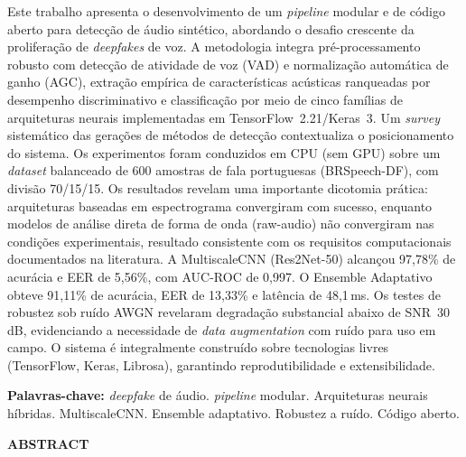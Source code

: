 \documentclass[12pt,a4paper]{article}
\begin{document}
\noindent
Este trabalho apresenta o desenvolvimento de um \textit{pipeline} modular e de
c\'{o}digo aberto para detec\c{c}\~{a}o de \'{a}udio sint\'{e}tico, abordando
o desafio crescente da prolifera\c{c}\~{a}o de \textit{deepfakes} de voz.
A metodologia integra pr\'{e}-processamento robusto com detec\c{c}\~{a}o de
atividade de voz (VAD) e normaliza\c{c}\~{a}o autom\'{a}tica de ganho (AGC),
extra\c{c}\~{a}o emp\'{i}rica de caracter\'{i}sticas ac\'{u}sticas ranqueadas
por desempenho discriminativo e classifica\c{c}\~{a}o por meio de cinco
fam\'{i}lias de arquiteturas neurais implementadas em TensorFlow~2.21/Keras~3.
Um \textit{survey} sistem\'{a}tico das gera\c{c}\~{o}es de m\'{e}todos de
detec\c{c}\~{a}o contextualiza o posicionamento do sistema.
Os experimentos foram conduzidos em CPU (sem GPU) sobre um \textit{dataset}
balanceado de 600 amostras de fala portuguesas (BRSpeech-DF), com divis\~{a}o
70/15/15.
Os resultados revelam uma importante dicotomia pr\'{a}tica: arquiteturas
baseadas em espectrograma convergiram com sucesso, enquanto modelos de
an\'{a}lise direta de forma de onda (raw-audio) n\~{a}o convergiram nas
condi\c{c}\~{o}es experimentais, resultado consistente com os requisitos
computacionais documentados na literatura.
A MultiscaleCNN (Res2Net-50) alcan\c{c}ou 97,78\% de acur\'{a}cia e EER de
5,56\%, com AUC-ROC de 0,997.
O Ensemble Adaptativo obteve 91,11\% de acur\'{a}cia, EER de 13,33\% e
lat\^{e}ncia de 48,1\,ms.
Os testes de robustez sob ru\'{i}do AWGN revelaram degrada\c{c}\~{a}o
substancial abaixo de SNR~30\,dB, evidenciando a necessidade de
\textit{data augmentation} com ru\'{i}do para uso em campo.
O sistema \'{e} integralmente constru\'{i}do sobre tecnologias livres
(TensorFlow, Keras, Librosa), garantindo reprodutibilidade e extensibilidade.

\vspace{0.4cm}
\noindent\textbf{Palavras-chave:} \textit{deepfake} de \'{a}udio.
\textit{pipeline} modular. Arquiteturas neurais h\'{i}bridas.
MultiscaleCNN. Ensemble adaptativo. Robustez a ru\'{i}do. C\'{o}digo aberto.

\vspace{1cm}
\begin{center}\textbf{ABSTRACT}\end{center}
\end{document}
